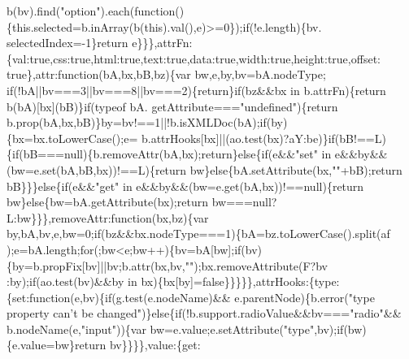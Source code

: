\begin{DoxyCode}
      b(bv).find(\textcolor{stringliteral}{"option"}).each(\textcolor{keyword}{function}()\{this.selected=b.inArray(b(\textcolor{keyword}{this}).val(),e)>=0\});\textcolor{keywordflow}{if}(!e.length)\{bv.
      selectedIndex=-1\}\textcolor{keywordflow}{return} e\}\}\},attrFn:\{val:\textcolor{keyword}{true},css:\textcolor{keyword}{true},html:\textcolor{keyword}{true},text:\textcolor{keyword}{true},data:\textcolor{keyword}{true},width:\textcolor{keyword}{true},height:\textcolor{keyword}{true},offset:\textcolor{keyword}{
      true}\},attr:\textcolor{keyword}{function}(bA,bx,bB,bz)\{var bw,e,by,bv=bA.nodeType;
\textcolor{keywordflow}{if}(!bA||bv===3||bv===8||bv===2)\{\textcolor{keywordflow}{return}\}\textcolor{keywordflow}{if}(bz&&bx in b.attrFn)\{\textcolor{keywordflow}{return} b(bA)[bx](bB)\}\textcolor{keywordflow}{if}(typeof bA.
      getAttribute===\textcolor{stringliteral}{"undefined"})\{\textcolor{keywordflow}{return} b.prop(bA,bx,bB)\}by=bv!==1||!b.isXMLDoc(bA);\textcolor{keywordflow}{if}(by)\{bx=bx.toLowerCase();e=
      b.attrHooks[bx]||(ao.test(bx)?aY:be)\}\textcolor{keywordflow}{if}(bB!==L)\{\textcolor{keywordflow}{if}(bB===null)\{b.removeAttr(bA,bx);\textcolor{keywordflow}{return}\}\textcolor{keywordflow}{else}\{\textcolor{keywordflow}{if}(e&&\textcolor{stringliteral}{"set"} 
      in e&&by&&(bw=e.set(bA,bB,bx))!==L)\{\textcolor{keywordflow}{return} bw\}\textcolor{keywordflow}{else}\{bA.setAttribute(bx,\textcolor{stringliteral}{""}+bB);\textcolor{keywordflow}{return} bB\}\}\}\textcolor{keywordflow}{else}\{\textcolor{keywordflow}{if}(e&&\textcolor{stringliteral}{"get"} in 
      e&&by&&(bw=e.get(bA,bx))!==null)\{\textcolor{keywordflow}{return} bw\}\textcolor{keywordflow}{else}\{bw=bA.getAttribute(bx);\textcolor{keywordflow}{return} bw===null?
      L:bw\}\}\},removeAttr:\textcolor{keyword}{function}(bx,bz)\{var by,bA,bv,e,bw=0;\textcolor{keywordflow}{if}(bz&&bx.nodeType===1)\{bA=bz.toLowerCase().split(af
      );e=bA.length;\textcolor{keywordflow}{for}(;bw<e;bw++)\{bv=bA[bw];\textcolor{keywordflow}{if}(bv)\{by=b.propFix[bv]||bv;b.attr(bx,bv,\textcolor{stringliteral}{""});bx.removeAttribute(F?bv
      :by);\textcolor{keywordflow}{if}(ao.test(bv)&&by in bx)\{bx[by]=\textcolor{keyword}{false}\}\}\}\}\},attrHooks:\{type:\{set:\textcolor{keyword}{function}(e,bv)\{\textcolor{keywordflow}{if}(g.test(e.nodeName)&&
      e.parentNode)\{b.error(\textcolor{stringliteral}{"type property can't be changed"})\}\textcolor{keywordflow}{else}\{\textcolor{keywordflow}{if}(!b.support.radioValue&&bv===\textcolor{stringliteral}{"radio"}&&
      b.nodeName(e,\textcolor{stringliteral}{"input"}))\{var bw=e.value;e.setAttribute(\textcolor{stringliteral}{"type"},bv);\textcolor{keywordflow}{if}(bw)\{e.value=bw\}\textcolor{keywordflow}{return} bv\}\}\}\},value:\{\textcolor{keyword}{get}:\textcolor{keyword}{
}
\end{DoxyCode}
